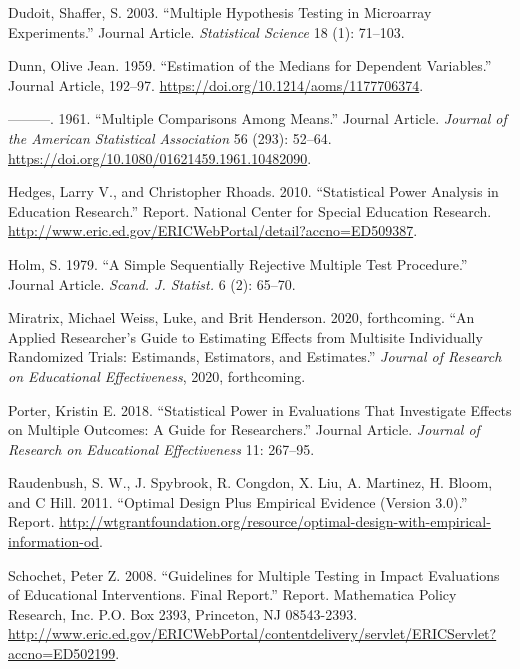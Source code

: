 \documentclass[
]{article}
\newlength{\cslhangindent}
\newlength{\cslentryspacingunit} %
\newenvironment{CSLReferences}[2] %
 {%
  \setlength{\parindent}{0pt}
  \ifodd #1
  \let\oldpar\par
  \def\par{\hangindent=\cslhangindent\oldpar}
  \fi
  \setlength{\parskip}{#2\cslentryspacingunit}
 }%
 {}
\begin{document}
\begin{CSLReferences}{1}{0}
\leavevmode{}%
Dudoit, Shaffer, S. 2003. {``Multiple Hypothesis Testing in Microarray
Experiments.''} Journal Article. \emph{Statistical Science} 18 (1):
71--103.

\leavevmode{}%
Dunn, Olive Jean. 1959. {``Estimation of the Medians for Dependent
Variables.''} Journal Article, 192--97.
\url{https://doi.org/10.1214/aoms/1177706374}.

\leavevmode{}%
---------. 1961. {``Multiple Comparisons Among Means.''} Journal
Article. \emph{Journal of the American Statistical Association} 56
(293): 52--64. \url{https://doi.org/10.1080/01621459.1961.10482090}.

\leavevmode{}%
Hedges, Larry V., and Christopher Rhoads. 2010. {``Statistical Power
Analysis in Education Research.''} Report. National Center for Special
Education Research.
\url{http://www.eric.ed.gov/ERICWebPortal/detail?accno=ED509387}.

\leavevmode{}%
Holm, S. 1979. {``A Simple Sequentially Rejective Multiple Test
Procedure.''} Journal Article. \emph{Scand. J. Statist.} 6 (2): 65--70.

\leavevmode{}%
Miratrix, Michael Weiss, Luke, and Brit Henderson. 2020, forthcoming.
{``An Applied Researcher's Guide to Estimating Effects from Multisite
Individually Randomized Trials: Estimands, Estimators, and Estimates.''}
\emph{Journal of Research on Educational Effectiveness}, 2020,
forthcoming.

\leavevmode{}%
Porter, Kristin E. 2018. {``Statistical Power in Evaluations That
Investigate Effects on Multiple Outcomes: A Guide for Researchers.''}
Journal Article. \emph{Journal of Research on Educational Effectiveness}
11: 267--95.

\leavevmode{}%
Raudenbush, S. W., J. Spybrook, R. Congdon, X. Liu, A. Martinez, H.
Bloom, and C Hill. 2011. {``Optimal Design Plus Empirical Evidence
(Version 3.0).''} Report.
\url{http://wtgrantfoundation.org/resource/optimal-design-with-empirical-information-od}.

\leavevmode{}%
Schochet, Peter Z. 2008. {``Guidelines for Multiple Testing in Impact
Evaluations of Educational Interventions. Final Report.''} Report.
Mathematica Policy Research, Inc. P.O. Box 2393, Princeton, NJ
08543-2393.
\url{http://www.eric.ed.gov/ERICWebPortal/contentdelivery/servlet/ERICServlet?accno=ED502199}.


\end{CSLReferences}
\end{document}
